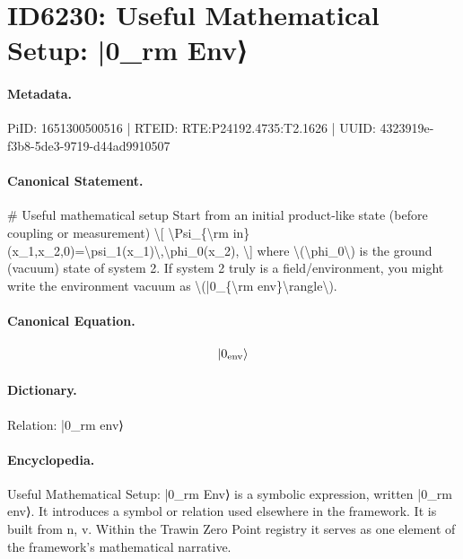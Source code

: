 \section*{ID6230: Useful Mathematical Setup: |0\_rm Env⟩}
\paragraph{Metadata.}
PiID: 1651300500516 | RTEID: RTE:P24192.4735:T2.1626 | UUID: 4323919e-f3b8-5de3-9719-d44ad9910507

\paragraph{Canonical Statement.}
\# Useful mathematical setup Start from an initial product-like state (before coupling or measurement) \textbackslash{}[ \textbackslash{}Psi\_\{\textbackslash{}rm in\}(x\_1,x\_2,0)=\textbackslash{}psi\_1(x\_1)\textbackslash{},\textbackslash{}phi\_0(x\_2), \textbackslash{}] where \textbackslash{}(\textbackslash{}phi\_0\textbackslash{}) is the ground (vacuum) state of system 2. If system 2 truly is a field/environment, you might write the environment vacuum as \textbackslash{}(|0\_\{\textbackslash{}rm env\}\textbackslash{}rangle\textbackslash{}).

\paragraph{Canonical Equation.}
\[
|0_{\rm env}\rangle
\]

\paragraph{Dictionary.}
Relation: |0\_rm env⟩

\paragraph{Encyclopedia.}
Useful Mathematical Setup: |0\_rm Env⟩ is a symbolic expression, written |0\_rm env⟩. It introduces a symbol or relation used elsewhere in the framework. It is built from n, v. Within the Trawin Zero Point registry it serves as one element of the framework's mathematical narrative.
